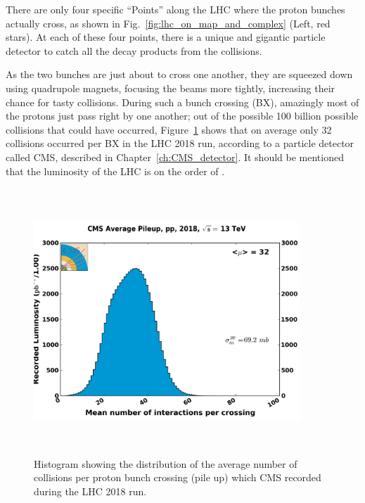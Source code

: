 There are only four specific ``Points'' along the LHC where the proton bunches actually cross, as shown in Fig.~\ref{fig:lhc_on_map_and_complex} (Left, red stars).
At each of these four points, there is a unique and gigantic particle detector to catch all the decay products from the \pp collisions. 

As the two bunches are just about to cross one another, they are squeezed down using quadrupole magnets, focusing the beams more tightly, increasing their chance for tasty \pp collisions.
During such a bunch crossing (BX), amazingly most of the protons just pass right by one another; 
out of the possible 100 billion possible collisions that could have occurred, Figure~\ref{plt:pileup} shows that on average only 32 collisions occurred per BX in the LHC 2018 run, according to a particle detector called CMS, described in Chapter~\ref{ch:CMS_detector}.
It should be mentioned that the luminosity of the LHC is on the order of \LHigh. %
\begin{figure}[pbth]
\centering
\includegraphics[width=10cm,height=10cm,keepaspectratio]{figures/lhc/pileup_pp_2018.png}
    \caption{Histogram showing the distribution of the average number of \pp collisions per proton bunch crossing (pile up) which CMS recorded during the LHC 2018 run.} 
    \label{plt:pileup}
\end{figure}

